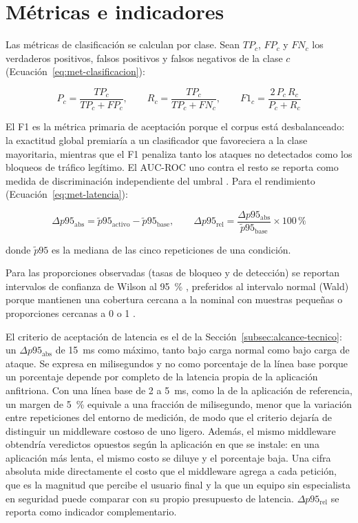 \section{Métricas e indicadores}
\label{sec:met-metricas}

Las métricas de clasificación se calculan por clase. Sean $TP_c$, $FP_c$ y $FN_c$ los
verdaderos positivos, falsos positivos y falsos negativos de la clase $c$ (Ecuación~\eqref{eq:met-clasificacion}):

\begin{equation}
P_c = \frac{TP_c}{TP_c + FP_c}, \qquad
R_c = \frac{TP_c}{TP_c + FN_c}, \qquad
F1_c = \frac{2\,P_c\,R_c}{P_c + R_c}
\label{eq:met-clasificacion}
\end{equation}

El F1 es la métrica primaria de aceptación porque el corpus está desbalanceado: la exactitud
global premiaría a un clasificador que favoreciera a la clase mayoritaria, mientras que el F1
penaliza tanto los ataques no detectados como los bloqueos de tráfico legítimo. El AUC-ROC uno
contra el resto se reporta como medida de discriminación independiente del umbral
\cite{fawcett2006}. Para el rendimiento (Ecuación~\eqref{eq:met-latencia}):

\begin{equation}
\Delta p95_{\mathrm{abs}} = \tilde{p}95_{\mathrm{activo}} - \tilde{p}95_{\mathrm{base}}, \qquad
\Delta p95_{\mathrm{rel}} = \frac{\Delta p95_{\mathrm{abs}}}{\tilde{p}95_{\mathrm{base}}} \times 100\,\%
\label{eq:met-latencia}
\end{equation}

\noindent donde $\tilde{p}95$ es la mediana de las cinco repeticiones de una condición.

Para las proporciones observadas (tasas de bloqueo y de detección) se reportan intervalos de confianza de Wilson al 95~\% \cite{wilson1927probable}, preferidos al intervalo normal (Wald) porque mantienen una cobertura cercana a la nominal con muestras pequeñas o proporciones cercanas a 0 o 1 \cite{brown2001interval}.

El criterio de aceptación de latencia es el de la Sección~\ref{subsec:alcance-tecnico}: un
$\Delta p95_{\mathrm{abs}}$ de 15~ms como máximo, tanto bajo carga normal como bajo carga de
ataque. Se expresa en milisegundos y no como porcentaje de la línea base porque un porcentaje
depende por completo de la latencia propia de la aplicación anfitriona. Con una línea base de 2 a
5~ms, como la de la aplicación de referencia, un margen de 5~\% equivale a una fracción de
milisegundo, menor que la variación entre repeticiones del entorno de medición, de modo que el
criterio dejaría de distinguir un middleware costoso de uno ligero. Además, el mismo middleware
obtendría veredictos opuestos según la aplicación en que se instale: en una aplicación más lenta,
el mismo costo se diluye y el porcentaje baja. Una cifra absoluta mide directamente el costo que
el middleware agrega a cada petición, que es la magnitud que percibe el usuario final y la que un
equipo sin especialista en seguridad puede comparar con su propio presupuesto de latencia.
$\Delta p95_{\mathrm{rel}}$ se reporta como indicador complementario.

